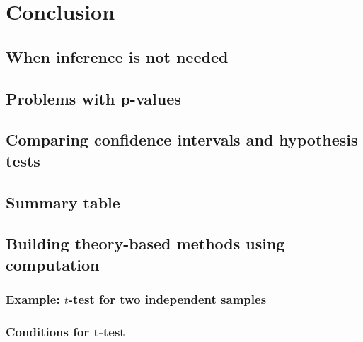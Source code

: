 \documentclass[
  12pt, krantz2,
]{krantz}
\begin{document}
\hypertarget{conclusion-6}{%
\section{Conclusion}\label{conclusion-6}}

\hypertarget{when-inference-is-not-needed}{%
\subsection{When inference is not needed}\label{when-inference-is-not-needed}}

\hypertarget{problems-with-p-values}{%
\subsection{Problems with p-values}\label{problems-with-p-values}}

\hypertarget{comparing-confidence-intervals-and-hypothesis-tests}{%
\subsection{Comparing confidence intervals and hypothesis tests}\label{comparing-confidence-intervals-and-hypothesis-tests}}

\hypertarget{ht-conclusion-table}{%
\subsection{Summary table}\label{ht-conclusion-table}}

\hypertarget{theory-hypo}{%
\subsection{Building theory-based methods using computation}\label{theory-hypo}}

\hypertarget{example-t-test-for-two-independent-samples}{%
\subsubsection*{\texorpdfstring{Example: \(t\)-test for two independent samples}{Example: t-test for two independent samples}}\label{example-t-test-for-two-independent-samples}}


\hypertarget{conditions-for-t-test}{%
\subsubsection*{Conditions for t-test}\label{conditions-for-t-test}}
\end{document}
